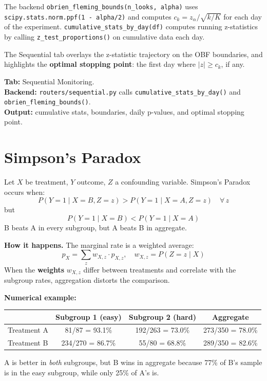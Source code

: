 \documentclass[11pt,a4paper]{article}
\newcommand{\code}[1]{\texttt{#1}}
\newcommand{\scipy}[1]{\texttt{scipy.stats.#1}}
\begin{document}
\vspace{8pt}

\begin{application}
The backend \code{obrien\_fleming\_bounds(n\_looks, alpha)} uses \scipy{norm.ppf(1 - alpha/2)} and computes $c_k = z_\alpha / \sqrt{k/K}$ for each day of the experiment. \code{cumulative\_stats\_by\_day(df)} computes running z-statistics by calling \code{z\_test\_proportions()} on cumulative data each day.

The Sequential tab overlays the z-statistic trajectory on the OBF boundaries, and highlights the \textbf{optimal stopping point}: the first day where $|z| \geq c_k$, if any.
\end{application}

\vspace{8pt}

\begin{dashlink}
\textbf{Tab:} Sequential Monitoring.\\
\textbf{Backend:} \code{routers/sequential.py} calls \code{cumulative\_stats\_by\_day()} and \code{obrien\_fleming\_bounds()}.\\
\textbf{Output:} cumulative stats, boundaries, daily p-values, and optimal stopping point.
\end{dashlink}


\section{Simpson's Paradox}
\label{sec:simpson}

\begin{formaldef}
Let $X$ be treatment, $Y$ outcome, $Z$ a confounding variable. Simpson's Paradox occurs when:
\[
P(Y{=}1 \mid X{=}B, Z{=}z) > P(Y{=}1 \mid X{=}A, Z{=}z) \quad \forall\, z
\]
but
\[
P(Y{=}1 \mid X{=}B) < P(Y{=}1 \mid X{=}A)
\]
B beats A in every subgroup, but A beats B in aggregate.

\medskip
\textbf{How it happens.} The marginal rate is a weighted average:
\[
p_X = \sum_z w_{X,z} \cdot p_{X,z}, \quad w_{X,z} = P(Z{=}z \mid X)
\]
When the \textbf{weights} $w_{X,z}$ differ between treatments and correlate with the subgroup rates, aggregation distorts the comparison.

\medskip
\textbf{Numerical example:}

\medskip
\begin{tabular}{@{}lccc@{}}
\toprule
 & Subgroup 1 (easy) & Subgroup 2 (hard) & Aggregate \\
\midrule
Treatment A & 81/87 = 93.1\% & 192/263 = 73.0\% & 273/350 = 78.0\% \\
Treatment B & 234/270 = 86.7\% & 55/80 = 68.8\% & 289/350 = 82.6\% \\
\bottomrule
\end{tabular}

\medskip
A is better in \emph{both} subgroups, but B wins in aggregate because 77\% of B's sample is in the easy subgroup, while only 25\% of A's is.
\end{formaldef}
\end{document}
